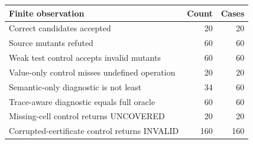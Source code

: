 \begin{tabular}{l r r}
\toprule
Finite observation & Count & Cases \\
\midrule
Correct candidates accepted & 20 & 20 \\
Source mutants refuted & 60 & 60 \\
Weak test control accepts invalid mutants & 60 & 60 \\
Value-only control misses undefined operation & 20 & 20 \\
Semantic-only diagnostic is not least & 34 & 60 \\
Trace-aware diagnostic equals full oracle & 60 & 60 \\
Missing-cell control returns UNCOVERED & 20 & 20 \\
Corrupted-certificate control returns INVALID & 160 & 160 \\
\bottomrule
\end{tabular}
